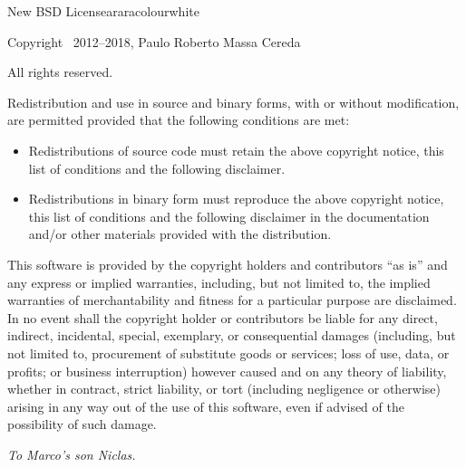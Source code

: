 \documentclass[a4paper,twoside,12pt]{memoir}
\begin{document}
\begin{messagebox}{New BSD License}{araracolour}{\icinfo}{white}
\scalebox{2}{\Huge\arara}

{\footnotesize\slogan}

\vspace{1em}

Copyright \textcopyright\ 2012--2018, Paulo Roberto Massa Cereda

All rights reserved.

\vspace{1em}

Redistribution and use in source and binary forms, with or without modification, are permitted provided that the following conditions are met:

\begin{itemize}
\item Redistributions of source code must retain the above copyright notice, this list of conditions and the following disclaimer.
\item Redistributions in binary form must reproduce the above copyright notice, this list of conditions and the following disclaimer in the documentation and/or other materials provided with the distribution.
\end{itemize}

This software is provided by the copyright holders and contributors ``as is'' and any express or implied warranties, including, but not limited to, the implied warranties of merchantability and fitness for a particular purpose are disclaimed. In no event shall the copyright holder or contributors be liable for any direct, indirect, incidental, special, exemplary, or consequential damages (including, but not limited to, procurement of substitute goods or services; loss of use, data, or profits; or business interruption) however caused and on any theory of liability, whether in contract, strict liability, or tort (including negligence or otherwise) arising in any way out of the use of this software, even if advised of the possibility of such damage.
\end{messagebox}

\cleardoublepage

\vspace*{25em}

\begin{flushright}
\em To Marco's son Niclas.
\end{flushright}

\cleardoublepage

\tableofcontents*
\end{document}
